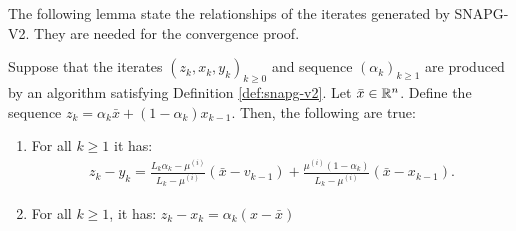 \documentclass[12pt]{article}
\begin{document}
        The following lemma state the relationships of the iterates generated by SNAPG-V2. 
        They are needed for the convergence proof. 
        \begin{lemma}\label{lemma:snapg2-itrs-props}
            Suppose that the iterates $(z_k, x_k, y_k)_{k \ge 0}$ and sequence $(\alpha_k)_{k \ge 1}$ are produced by an algorithm satisfying Definition \ref{def:snapg-v2}. 
            Let $\bar x \in \mathbb R^n$.
            Define the sequence $z_k = \alpha_k\bar x + (1 - \alpha_k)x_{k - 1}$. 
            Then, the following are true: 
            \begin{enumerate}
                \item\label{lemma:snapg2-itrs-props-item1} For all $k \ge 1$ it has: 
                \begin{align*}
                        z_k - y_k 
                        = 
                        \frac{L_k\alpha_k - \mu^{(i)}}{L_k - \mu^{(i)}}(\bar x - v_{k - 1})
                        + \frac{\mu^{(i)}(1 - \alpha_k)}{L_k - \mu^{(i)}}(\bar x - x_{k - 1}).
                \end{align*}
                \item\label{lemma:snapg2-itrs-props-item2} For all $k \ge 1$, it has: $z_k - x_k = \alpha_k(x - \bar x)$
            \end{enumerate}
        \end{lemma}
\end{document}
